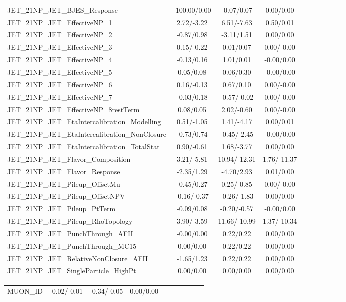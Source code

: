 \begin{table}[h]
\begin{center}
\begin{tabular}{l|ccccccccc}
JET\_21NP\_JET\_BJES\_Response &-100.00/0.00 &-0.07/0.07 &0.00/0.00 \\
JET\_21NP\_JET\_EffectiveNP\_1 &2.72/-3.22 &6.51/-7.63 &0.50/0.01 \\
JET\_21NP\_JET\_EffectiveNP\_2 &-0.87/0.98 &-3.11/1.51 &0.00/0.00 \\
JET\_21NP\_JET\_EffectiveNP\_3 &0.15/-0.22 &0.01/0.07 &0.00/-0.00 \\
JET\_21NP\_JET\_EffectiveNP\_4 &-0.13/0.16 &1.01/0.01 &-0.00/0.00 \\
JET\_21NP\_JET\_EffectiveNP\_5 &0.05/0.08 &0.06/0.30 &-0.00/0.00 \\
JET\_21NP\_JET\_EffectiveNP\_6 &0.16/-0.13 &0.67/0.10 &0.00/-0.00 \\
JET\_21NP\_JET\_EffectiveNP\_7 &-0.03/0.18 &-0.57/-0.02 &0.00/-0.00 \\
JET\_21NP\_JET\_EffectiveNP\_8restTerm &0.08/0.05 &2.02/-0.60 &0.00/-0.00 \\
JET\_21NP\_JET\_EtaIntercalibration\_Modelling &0.51/-1.05 &1.41/-4.17 &0.00/0.01 \\
JET\_21NP\_JET\_EtaIntercalibration\_NonClosure &-0.73/0.74 &-0.45/-2.45 &-0.00/0.00 \\
JET\_21NP\_JET\_EtaIntercalibration\_TotalStat &0.90/-0.61 &1.68/-3.77 &0.00/0.00 \\
JET\_21NP\_JET\_Flavor\_Composition &3.21/-5.81 &10.94/-12.31 &1.76/-11.37 \\
JET\_21NP\_JET\_Flavor\_Response &-2.35/1.29 &-4.70/2.93 &0.01/0.00 \\
JET\_21NP\_JET\_Pileup\_OffsetMu &-0.45/0.27 &0.25/-0.85 &0.00/-0.00 \\
JET\_21NP\_JET\_Pileup\_OffsetNPV &-0.16/-0.37 &-0.26/-1.83 &0.00/0.00 \\
JET\_21NP\_JET\_Pileup\_PtTerm &-0.09/0.08 &-0.20/-0.57 &-0.00/0.00 \\
JET\_21NP\_JET\_Pileup\_RhoTopology &3.90/-3.59 &11.66/-10.99 &1.37/-10.34 \\
JET\_21NP\_JET\_PunchThrough\_AFII &-0.00/0.00 &0.22/0.22 &0.00/0.00 \\
JET\_21NP\_JET\_PunchThrough\_MC15 &0.00/0.00 &0.22/0.22 &0.00/0.00 \\
JET\_21NP\_JET\_RelativeNonClosure\_AFII &-1.65/1.23 &0.22/0.22 &0.00/0.00 \\
JET\_21NP\_JET\_SingleParticle\_HighPt &0.00/0.00 &0.00/0.00 &0.00/0.00 \\
\hline \end{tabular} \end{center} \end{table} \begin{table}[h] \scriptsize \begin{center} \begin{tabular}{l|ccccccccc} \hline MUON\_ID &-0.02/-0.01 &-0.34/-0.05 &0.00/0.00 \\

\end{tabular}
\end{center}
\end{table}
